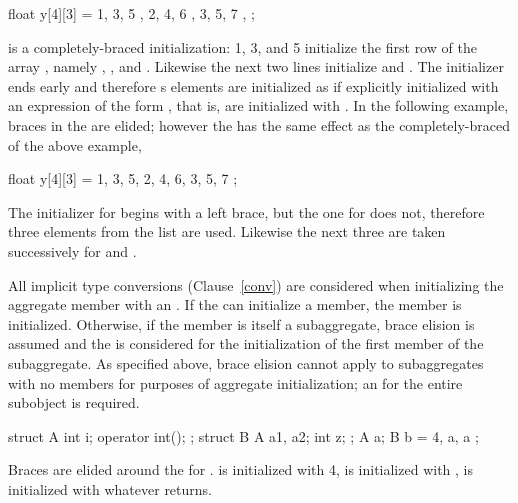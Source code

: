 \begin{codeblock}
float y[4][3] = {
  { 1, 3, 5 },
  { 2, 4, 6 },
  { 3, 5, 7 },
};
\end{codeblock}

is a completely-braced initialization:
1, 3, and 5 initialize the first row of the array
,
namely
,
,
and
.
Likewise the next two lines initialize
and
.
The initializer ends early and therefore
s
elements are initialized as if explicitly initialized with an
expression of the form
,
that is, are initialized with
.
In the following example, braces in the
are elided;
however the
has the same effect as the completely-braced
of the above example,

\begin{codeblock}
float y[4][3] = {
  1, 3, 5, 2, 4, 6, 3, 5, 7
};
\end{codeblock}

The initializer for
begins with a left brace, but the one for
does not,
therefore three elements from the list are used.
Likewise the next three are taken successively for
and
.
\exitexample

\pnum
All implicit type conversions (Clause~\ref{conv}) are considered when
initializing the aggregate member with an .
If the
can initialize a member, the member is initialized.
Otherwise, if the member is itself a subaggregate,
brace elision is assumed and the
is considered for the initialization of the first member of the subaggregate.
\enternote As specified above, brace elision cannot apply to
subaggregates with no members for purposes of aggregate initialization; an
 for the entire subobject is
required.\exitnote

\enterexample

\begin{codeblock}
struct A {
  int i;
  operator int();
};
struct B {
  A a1, a2;
  int z;
};
A a;
B b = { 4, a, a };
\end{codeblock}

Braces are elided around the
for
.
is initialized with 4,
is initialized with
,
is initialized with whatever
returns.
\exitexample

